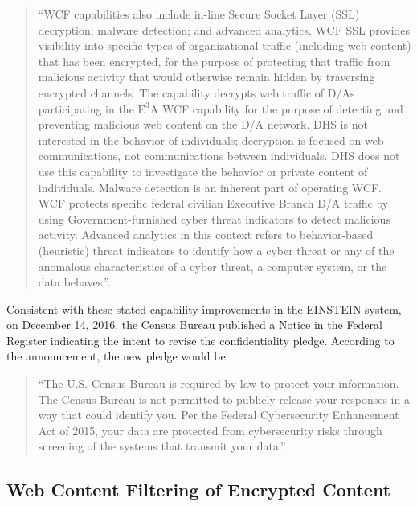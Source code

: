 \documentclass[fleqn,10pt]{wlscirep}
\newcommand{\ETA}{$\textrm{E}^\textrm{3}\textrm{A}$\xspace}
\begin{document}
\begin{quote}
``WCF capabilities also include in-line Secure Socket Layer (SSL)
decryption; malware detection; and advanced analytics. WCF SSL
provides visibility into specific types of organizational traffic
(including web content) that has been encrypted, for the purpose of
protecting that traffic from malicious activity that would otherwise
remain hidden by traversing encrypted channels. The capability
decrypts web traffic of D/As participating in the \ETA WCF capability
for the purpose of detecting and preventing malicious web content on
the D/A network.  DHS is not interested in the behavior of
individuals; decryption is focused on web communications, not
communications between individuals. DHS does not use this capability
to investigate the behavior or private content of individuals. Malware
detection is an inherent part of operating WCF. WCF protects specific
federal civilian Executive Branch D/A traffic by using
Government-furnished cyber threat indicators to detect malicious
activity. Advanced analytics in this context refers to behavior-based
(heuristic) threat indicators to identify how a cyber threat or any of
the anomalous characteristics of a cyber threat, a computer system, or
the data behaves.''\cite[p.3]{dhs-e3a-pia2}.
\end{quote}

Consistent with these stated capability improvements in the EINSTEIN
system, on December 14, 2016, the Census Bureau published a Notice in
the Federal Register indicating the intent to revise the
confidentiality pledge.\cite{federal-register-2016-12-14} According to
the announcement, the new pledge would be:

\begin{quote}
  ``The U.S. Census Bureau is required by law to protect your
  information. The Census Bureau is not permitted to publicly release
  your responses in a way that could identify you. Per the Federal
  Cybersecurity Enhancement Act of 2015, your data are protected from
  cybersecurity risks through screening of the systems that transmit
  your data.''\cite{federal-register-2016-12-14}\cite{pledge}
\end{quote}

\subsection{Web Content Filtering of Encrypted Content}
\end{document}
